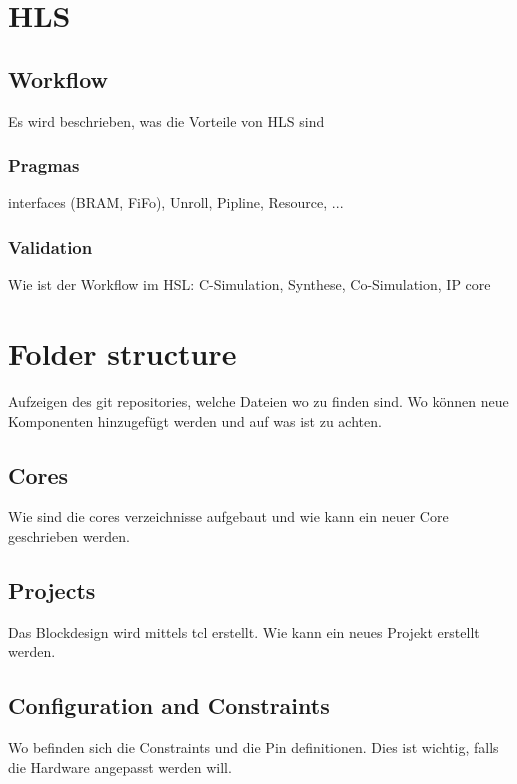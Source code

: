 \section{HLS}
\subsection{Workflow}
Es wird beschrieben, was die Vorteile von HLS sind

\subsubsection{Pragmas}
interfaces (BRAM, FiFo), Unroll, Pipline, Resource, ...

\subsubsection{Validation}
Wie ist der Workflow im HSL: C-Simulation, Synthese, Co-Simulation, IP core

\section{Folder structure}
Aufzeigen des git repositories, welche Dateien wo zu finden sind. Wo können neue
Komponenten hinzugefügt werden und auf was ist zu achten.

\subsection{Cores}
Wie sind die cores verzeichnisse aufgebaut und wie kann ein neuer Core geschrieben 
werden.

\subsection{Projects}
Das Blockdesign wird mittels tcl erstellt. Wie kann ein neues Projekt erstellt werden.

\subsection{Configuration and Constraints}
Wo befinden sich die Constraints und die Pin definitionen. Dies ist wichtig,
falls die Hardware angepasst werden will.

